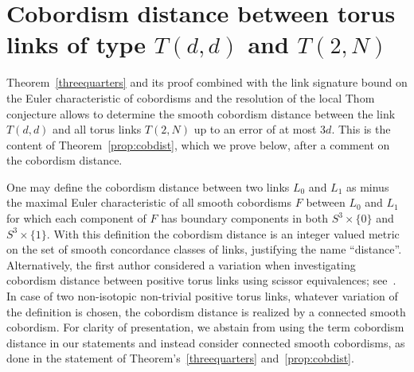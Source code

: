 \documentclass[10pt,a4paper]{article}
\theoremstyle{definition}
\numberwithin{equation}{section}
\begin{document}
\section{Cobordism distance between torus links of type \texorpdfstring{$T(d,d)$}{T(d,d)} and \texorpdfstring{$T(2,N)$}{T(2,N)}}\label{sec:asymdist}

Theorem~\ref{threequarters} and its proof combined with the link signature bound on the Euler characteristic of cobordisms and the resolution of the local Thom conjecture allows to determine the smooth cobordism distance between the link $T(d,d)$ and all torus links $T(2,N)$ up to an error of at most $3d$. This is the content of Theorem~\ref{prop:cobdist}, which we prove below, after a comment on the cobordism distance.

One may define the cobordism distance between two links $L_0$ and $L_1$ as minus the maximal Euler characteristic of all smooth cobordisms $F$ between $L_0$ and $L_1$ for which each component of $F$ has boundary components in both $S^3\times\{0\}$ and $S^3\times\{1\}$. With this definition the cobordism distance is an integer valued metric on the set of smooth concordance classes of links, justifying the name ``distance''. Alternatively, the first author considered a variation when investigating cobordism distance between positive torus links using scissor equivalences; see~\cite{Baader_ScissorEq}. In case of two non-isotopic non-trivial positive torus links, whatever variation of the definition is chosen, the cobordism distance is realized by a connected smooth cobordism. For clarity of presentation, we abstain from using the term cobordism distance in our statements and instead consider connected smooth cobordisms, as done in the statement of Theorem's~\ref{threequarters} and~\ref{prop:cobdist}.
\end{document}
